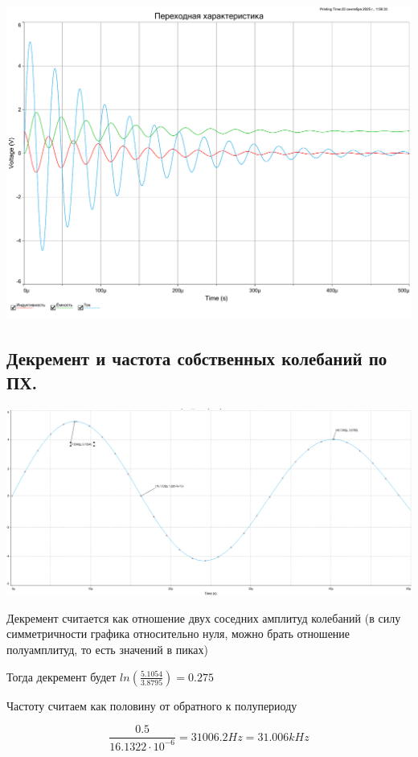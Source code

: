 \documentclass[12pt,a4paper]{article}
\begin{document}
			\includegraphics[width=1\linewidth]{src/TH}

		\newpage
		
		\subsection{Декремент и частота собственных колебаний по ПХ.\newline}
		
			\includegraphics[width=1\linewidth]{src/TH_current}
			
			Декремент считается как отношение двух соседних амплитуд колебаний (в силу симметричности графика относительно нуля, можно брать отношение полуамплитуд, то есть значений в пиках)
			
			Тогда декремент будет $ln\left(\frac{5.1054}{3.8795}\right) = 0.275$

			Частоту считаем как половину от обратного к полупериоду
			
			\[\frac{0.5}{16.1322 \cdot 10^{-6}} = 31006.2 Hz = 31.006 kHz\]
			
\end{document}
